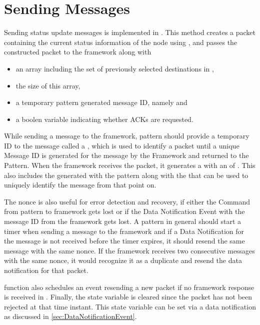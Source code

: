 \section {Sending Messages} \label{sec:SendingMessages}

Sending status update messages is implemented in
. 
This method creates a packet containing the
current status information of the node using
, 
and passes the constructed packet to the framework
along with 
\begin{itemize}
\item an array including the set of previously selected destinations in ,
\item the size of this array,
\item a temporary pattern generated message ID, namely  and
\item a boolen variable indicating whether ACKs are requested. 
\end{itemize}

While sending a message to the framework, pattern should provide a temporary ID to the message called a , which is used to identify a packet until a unique Message ID is generated for the message by the Framework and returned to the Pattern. 
When the framework receives the packet, it generates a  with an  of .  
This  also includes the  generated with the pattern along with the  that can be used to uniquely identify the message from that point on.

The nonce is also useful for error detection and recovery, if either the Command from pattern to framework gets lost or if the Data Notification Event with the message ID from the framework gets lost. A pattern in general should start a timer when sending a message to the framework and if a Data Notification for the message is not received before the timer expires, it should resend the same message with the same nonce. If the framework receives two consecutive messages with the same nonce, it would recognize it as a duplicate and resend the data notification for that packet. 
 

 function also schedules an event resending a new packet if no framework response is received in . 
Finally, the  state variable is cleared since the packet has not been rejected at that time instant. 
This state variable can be set via a data notification as discussed in \cref{sec:DataNotificationEvent}.

